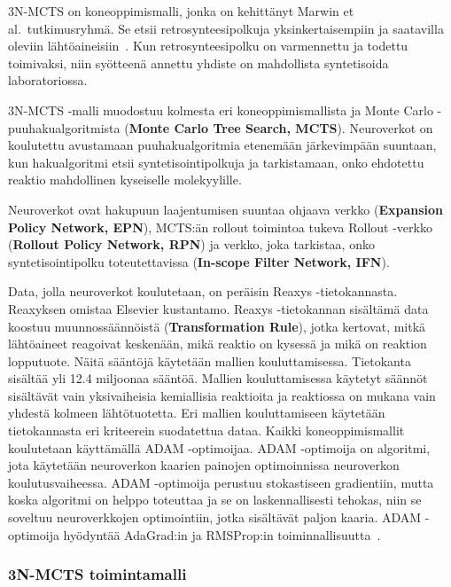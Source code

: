 \documentclass[finnish,twoside,censored,tkt,sw-line]{HYthesisML}
\begin{document}
3N-MCTS on koneoppimismalli, jonka on kehittänyt Marwin et al.\ tutkimusryhmä.
Se etsii retrosynteesipolkuja yksinkertaisempiin ja saatavilla oleviin lähtöaineisiin~\cite{SeglerMarwinHS2018Pcsw}.
Kun retrosynteesipolku on varmennettu ja todettu toimivaksi, niin syötteenä annettu yhdiste on mahdollista syntetisoida laboratoriossa.

3N-MCTS -malli muodostuu kolmesta eri koneoppimismallista ja Monte Carlo -puuhakualgoritmista (\textbf{Monte Carlo Tree Search, MCTS}).
Neuroverkot on koulutettu avustamaan puuhakualgoritmia etenemään järkevimpään suuntaan, kun hakualgoritmi etsii syntetisointipolkuja ja tarkistamaan, onko ehdotettu reaktio mahdollinen kyseiselle molekyylille.

Neuroverkot ovat hakupuun laajentumisen suuntaa ohjaava verkko (\textbf{Expansion Policy Network, EPN}), MCTS:än rollout toimintoa tukeva Rollout -verkko (\textbf{Rollout Policy Network, RPN}) ja verkko, joka tarkistaa, onko syntetisointipolku toteutettavissa (\textbf{In-scope Filter Network, IFN}).

Data, jolla neuroverkot koulutetaan, on peräisin Reaxys -tietokannasta.
Reaxyksen omistaa Elsevier kustantamo.
Reaxys -tietokannan sisältämä data koostuu muunnossäännöistä (\textbf{Transformation Rule}), jotka kertovat, mitkä lähtöaineet reagoivat keskenään, mikä reaktio on kysessä ja mikä on reaktion lopputuote.
Näitä sääntöjä käytetään mallien kouluttamisessa.
Tietokanta sisältää yli 12.4 miljoonaa sääntöä.
Mallien kouluttamisessa käytetyt säännöt sisältävät vain yksivaiheisia kemiallisia reaktioita ja reaktiossa on mukana vain yhdestä kolmeen lähtötuotetta.
Eri mallien kouluttamiseen käytetään tietokannasta eri kriteerein suodatettua dataa.
Kaikki koneoppimismallit koulutetaan käyttämällä ADAM -optimoijaa.
ADAM -optimoija on algoritmi, jota käytetään neuroverkon kaarien painojen optimoinnissa neuroverkon koulutusvaiheessa.
ADAM -optimoija perustuu stokastiseen gradientiin, mutta koska algoritmi on helppo toteuttaa ja se on laskennallisesti tehokas, niin se soveltuu neuroverkkojen optimointiin, jotka sisältävät paljon kaaria.
ADAM -optimoija hyödyntää AdaGrad:in ja RMSProp:in toiminnallisuutta~\cite{kingma2017adam}.

\subsubsection{3N-MCTS toimintamalli}
\end{document}
